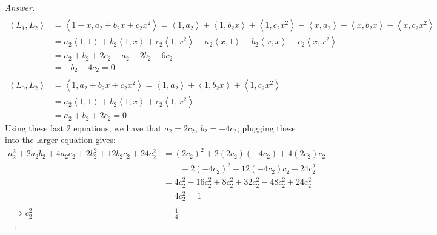 \documentclass{article}
\newcommand{\abracks}[1]{\left< #1\right>}
\begin{document}
\begin{proof}[Answer]
\begin{align*}
    \end{align*}
    \begin{align*}
    \abracks{L_1, L_2} &= \abracks{1 - x, a_2 + b_2x + c_2x^2} = 
    \abracks{1, a_2} + \abracks{1, b_2x} + \abracks{1, c_2x^2} - \abracks{x, a_2} - 
    \abracks{x, b_2x} - \abracks{x, c_2x^2} \\
    &= a_2\abracks{1, 1} + b_2\abracks{1, x} + c_2\abracks{1, x^2} - a_2\abracks{x, 1} - 
    b_2\abracks{x, x} - c_2\abracks{x, x^2} \\
    &= a_2 + b_2 + 2c_2 - a_2 - 
    2b_2 - 6c_2  \\
    &= -b_2 - 4c_2 = 0 \\\\
    \abracks{L_0, L_2} &= \abracks{1, a_2 + b_2x + c_2x^2} = \abracks{1, a_2} + 
    \abracks{1, b_2x} + \abracks{1, c_2x^2} \\
    &= a_2\abracks{1, 1} + b_2\abracks{1, x} + c_2\abracks{1, x^2} \\
    &= a_2 + b_2 + 2c_2 = 0 
    \end{align*}
    Using these last 2 equations, we have that $a_2 = 2c_2,\ b_2 = -4c_2$; plugging these 
    into the larger equation gives:
    \begin{align*}
    a_2^2 + 2a_2b_2 + 4a_2c_2 + 2b_2^2 + 12b_2c_2 + 24c_2^2 &= 
    (2c_2)^2 + 2(2c_2)(-4c_2) + 4(2c_2)c_2 \\
    &\qquad + 2(-4c_2)^2 + 12(-4c_2)c_2 + 24c_2^2 \\
    &= 4c_2^2 - 16c_2^2 + 8c_2^2 + 32c_2^2 - 48c_2^2 + 24c_2^2 \\
    &= 4c_2^2 = 1 \\\\
    \implies c_2^2 &= \frac{1}{4}
    \end{align*}


\end{proof}
\end{document}

